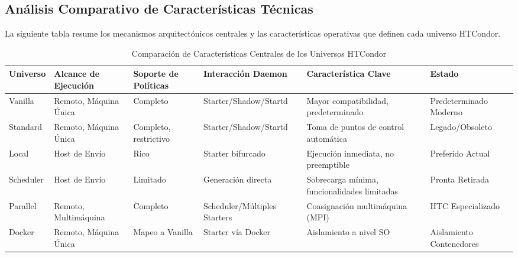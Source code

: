 \subsection{Análisis Comparativo de Características Técnicas}

La siguiente tabla resume los mecanismos arquitectónicos centrales y las características operativas que definen cada universo HTCondor.

\begin{table}[h]
	\centering
	\small
	\caption{Comparación de Características Centrales de los Universos HTCondor}
	\begin{tabular}{@{}p{2cm}p{2.2cm}p{2.2cm}p{2.5cm}p{3cm}p{2cm}@{}}
		\toprule
		\textbf{Universo} & \textbf{Alcance de Ejecución} & \textbf{Soporte de Políticas} & \textbf{Interacción Daemon}  & \textbf{Característica Clave}                & \textbf{Estado}          \\
		\midrule
		Vanilla           & Remoto, Máquina Única         & Completo                      & Starter/Shadow/Startd        & Mayor compatibilidad, predeterminado         & Predeterminado Moderno   \\
		\addlinespace
		Standard          & Remoto, Máquina Única         & Completo, restrictivo         & Starter/Shadow/Startd        & Toma de puntos de control automática         & Legado/Obsoleto          \\
		\addlinespace
		Local             & Host de Envío                 & Rico                          & Starter bifurcado            & Ejecución inmediata, no preemptible          & Preferido Actual         \\
		\addlinespace
		Scheduler         & Host de Envío                 & Limitado                      & Generación directa           & Sobrecarga mínima, funcionalidades limitadas & Pronta Retirada          \\
		\addlinespace
		Parallel          & Remoto, Multimáquina          & Completo                      & Scheduler/Múltiples Starters & Coasignación multimáquina (MPI)              & HTC Especializado        \\
		\addlinespace
		Docker            & Remoto, Máquina Única         & Mapeo a Vanilla               & Starter vía Docker           & Aislamiento a nivel SO                       & Aislamiento Contenedores \\
	\end{tabular}
\end{table}
